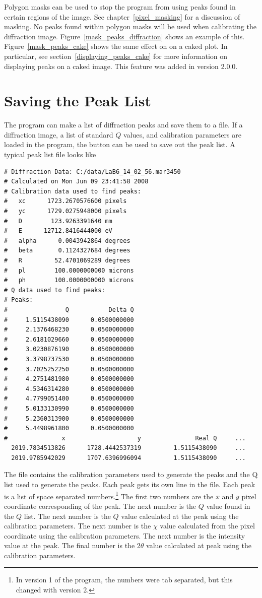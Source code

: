 Polygon masks can be used to stop the program from using peaks 
found in certain regions of the image. See chapter~\ref{pixel_masking} 
for a discussion of masking. No peaks found within polygon masks
will be used when calibrating the diffraction image.
Figure~\ref{mask_peaks_diffraction} shows an example of this. 
Figure~\ref{mask_peaks_cake} shows the same effect on on a caked 
plot. In 
particular, see section~\ref{displaying_peaks_cake} for more 
information on displaying peaks on a caked image. This feature was 
added in version 2.0.0.

\section{Saving the Peak List}

The program can make a list of diffraction peaks and 
save them to a file. If a diffraction image, a list of
standard $Q$ values, and calibration parameters are loaded
in the program, the  button can
be used to save out the peak list. 
A typical peak list file looks like
\begin{lstlisting}[basicstyle=\ttfamily\footnotesize]
# Diffraction Data: C:/data/LaB6_14_02_56.mar3450
# Calculated on Mon Jun 09 23:41:58 2008
# Calibration data used to find peaks:
#   xc      1723.2670576600 pixels
#   yc      1729.0275948000 pixels
#   D        123.9263391640 mm
#   E      12712.8416444000 eV
#   alpha      0.0043942864 degrees
#   beta       0.1124327684 degrees
#   R         52.4701069289 degrees
#   pl        100.0000000000 microns
#   ph        100.0000000000 microns
# Q data used to find peaks:
# Peaks:
#                Q           Delta Q
#     1.5115438090      0.0500000000
#     2.1376468230      0.0500000000
#     2.6181029660      0.0500000000
#     3.0230876190      0.0500000000
#     3.3798737530      0.0500000000
#     3.7025252250      0.0500000000
#     4.2751481980      0.0500000000
#     4.5346314280      0.0500000000
#     4.7799051400      0.0500000000
#     5.0133130990      0.0500000000
#     5.2360313900      0.0500000000
#     5.4498961800      0.0500000000
#               x                    y               Real Q     ...
  2019.7834513826      1728.4442537319         1.5115438090     ...
  2019.9785942029      1707.6396996094         1.5115438090     ...
\end{lstlisting}
The file contains the calibration parameters
used to generate the peaks and the Q list used
to generate the peaks. Each peak gets its
own line in the file. Each peak is a list of 
space separated numbers.\footnote{In version 1 
of the program, the numbers were tab separated, but
this changed with version 2.} The first two numbers are
the $x$ and $y$ pixel coordinate corresponding of
the peak. The next number is the $Q$ value found in the 
$Q$ list. The next number is the $Q$ value calculated 
at the peak using the calibration
parameters. The next number is the $\chi$ value calculated 
from the pixel coordinate using the calibration parameters. 
The next number is the intensity value at the peak. The final
number is the $2\theta$ value calculated at peak using 
the calibration parameters.

